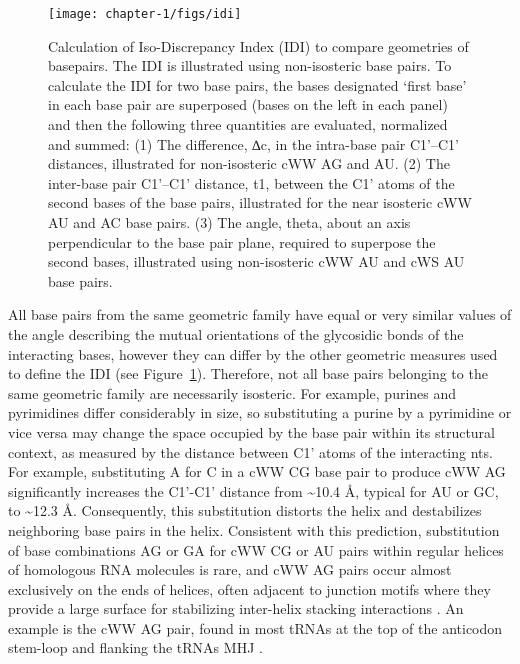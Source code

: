 \begin{figure}
  \texttt{[image: chapter-1/figs/idi]}
  \caption{Calculation of Iso-Discrepancy Index (IDI) to compare geometries of
    basepairs. The IDI is illustrated using non-isosteric base pairs. To
    calculate the IDI for two base pairs, the bases designated ‘first base’ in
    each base pair are superposed (bases on the left in each panel) and then the
    following three quantities are evaluated, normalized and summed: (1) The
    difference, ∆c, in the intra-base pair C1’–C1’ distances, illustrated for
    non-isosteric cWW AG and AU. (2) The inter-base pair C1’–C1’ distance, t1,
    between the C1’ atoms of the second bases of the base pairs, illustrated for
    the near isosteric cWW AU and AC base pairs. (3) The angle, theta, about an
    axis perpendicular to the base pair plane, required to superpose the second
  bases, illustrated using non-isosteric cWW AU and cWS AU base pairs.}
  \label{fig:idi}
\end{figure}

All base pairs from the same geometric family have equal or very similar values
of the angle describing the mutual orientations of the glycosidic bonds of the
interacting bases, however they can differ by the other geometric measures used
to define the IDI (see Figure~\ref{fig:idi}). Therefore, not all base pairs belonging to
the same geometric family are necessarily isosteric. For example, purines and
pyrimidines differ considerably in size, so substituting a purine by a
pyrimidine or vice versa may change the space occupied by the base pair within
its structural context, as measured by the distance between C1' atoms of the
interacting nts. For example, substituting A for C in a cWW CG base pair to
produce cWW AG significantly increases the C1'-C1' distance from \textasciitilde 10.4 \AA,
typical for AU or GC, to \textasciitilde 12.3 \AA. Consequently, this substitution distorts the
helix and destabilizes neighboring base pairs in the helix. Consistent with this
prediction, substitution of base combinations AG or GA for cWW CG or AU pairs
within regular helices of homologous RNA molecules is rare, and cWW AG pairs
occur almost exclusively on the ends of helices, often adjacent to junction
motifs where they provide a large surface for stabilizing inter-helix stacking
interactions \cite{Sponer2003}. An example is the cWW AG pair, found in most
tRNAs at the top of the anticodon stem-loop and flanking the tRNAs MHJ
\cite{Romby1985}.

